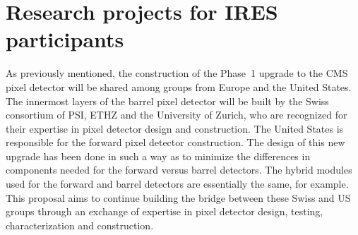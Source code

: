 \section{Research projects for IRES participants}
\label{sec:projects}

As previously mentioned, the construction of the Phase~1 upgrade to
the CMS pixel detector will be shared among groups from Europe and the
United States.  The innermost layers of the barrel pixel detector will
be built by the Swiss consortium of PSI, ETHZ and the University of
Zurich, who are recognized for their expertise in pixel detector
design and construction.  The United States is responsible for the
forward pixel detector construction.  The design of this new upgrade
has been done in such a way as to minimize the differences in
components needed for the forward versus barrel detectors.  The hybrid
modules used for the forward and barrel detectors are essentially the
same, for example.  This proposal aims to continue building the bridge
between these Swiss and US groups through an exchange of expertise in
pixel detector design, testing, characterization and construction.

